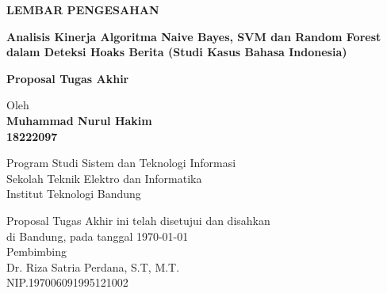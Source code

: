 \documentclass[12pt,a4paper,oneside]{book}
\begin{document}
\newpage
\thispagestyle{empty}
\begin{center}
  \textbf{\large LEMBAR PENGESAHAN}\\[1cm]
  \vspace*{1.5cm}
    
  {\large\bfseries Analisis Kinerja Algoritma Naive Bayes, SVM dan Random Forest dalam Deteksi Hoaks Berita (Studi Kasus Bahasa Indonesia)}\\
     \vspace{2cm}

  {\Large \textbf{Proposal Tugas Akhir}}\\


  \vspace{1.5cm}
    
    
  {\large Oleh}\\[0.3cm]
    \textbf{
    {\large Muhammad Nurul Hakim}\\
    {\large 18222097}
  }\\
    
  \vspace{0.5cm}
 
  {\large Program Studi Sistem dan Teknologi Informasi}\\
  {\large Sekolah Teknik Elektro dan Informatika}\\
  {\large Institut Teknologi Bandung}\\

  \vspace{1.5cm}

  Proposal Tugas Akhir ini telah disetujui dan disahkan\\ 
  di Bandung, pada tanggal \today\\[1cm]

	Pembimbing  \\[3cm]
	Dr. Riza Satria Perdana, S.T, M.T.   \\[0.2cm]
	NIP.197006091995121002

\end{center}

\vspace{1cm}
\noindent

\end{document}
